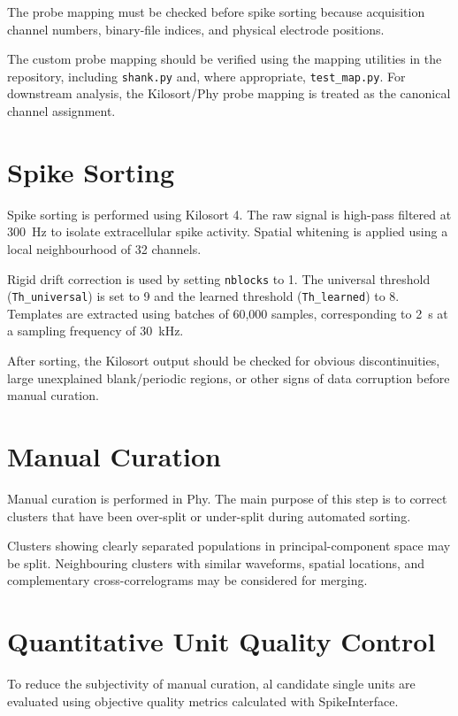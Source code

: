 \documentclass[11pt,a4paper]{article}
\begin{document}
The probe mapping must be checked before spike sorting because acquisition channel numbers, binary-file indices, and physical electrode positions.

The custom probe mapping should be verified using the mapping utilities in the repository, including \texttt{shank.py} and, where appropriate,
\texttt{test\_map.py}. For downstream analysis, the Kilosort/Phy probe mapping is treated as the canonical channel assignment.

\section{Spike Sorting}

Spike sorting is performed using Kilosort 4. The raw signal is high-pass
filtered at 300~Hz to isolate extracellular spike activity. Spatial whitening is applied using a local neighbourhood of 32 channels.

Rigid drift correction is used by setting \texttt{nblocks} to 1. The universal threshold (\texttt{Th\_universal}) is set to 9 and the learned threshold (\texttt{Th\_learned}) to 8. Templates are extracted using batches of 60,000 samples, corresponding to 2~s at a sampling frequency of 30~kHz.

After sorting, the Kilosort output should be checked for obvious discontinuities, large unexplained blank/periodic regions, or other signs of data corruption before manual curation.

\section{Manual Curation}

Manual curation is performed in Phy. The main purpose of this step is to correct clusters that have been over-split or under-split during automated sorting.

Clusters showing clearly separated populations in principal-component space may be split. Neighbouring clusters with similar waveforms, spatial locations, and complementary cross-correlograms may be considered for merging.

\section{Quantitative Unit Quality Control}

To reduce the subjectivity of manual curation, al candidate single units are evaluated using objective quality metrics calculated with SpikeInterface.
\end{document}
